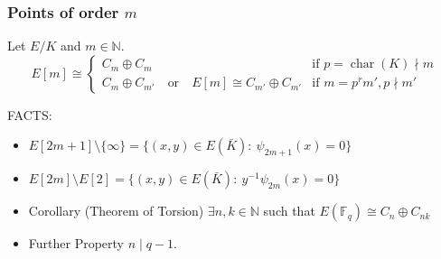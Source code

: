 \documentclass{beamer}%
\newcommand{\N}{\mathbb N}
\newcommand{\F}{\mathbb F}
\theoremstyle{definition}
\begin{document}
\begin{frame}\frametitle{Points of order $m$}
\pause

\begin{theorem}
Let $E/K$  and $m\in\N$. 
$$E[m]\cong \begin{cases}
             C_m\oplus C_m & \text{if }p=\operatorname{char}(K)\nmid m\\
             C_m\oplus C_{m'}\quad\text{or}\quad E[m] \cong C_{m'}\oplus C_{m'} &\text{if }m=p^rm', p\nmid m'
            \end{cases}
$$\end{theorem}\pause

\vspace*{-5mm}
\begin{beamerboxesrounded}[upper=block title example,lower=block body alerted,shadow=true]{FACTS:}
\begin{itemize}[<+-| alert@+>]
\item $E[2m+1]\setminus \{\infty\}= \{(x,y)\in E(\bar{K}):\  \psi_{2m+1}(x)=0\}$
\item $E[2m]\setminus E[2]= \{(x,y)\in E(\bar{K}):\  y^{-1}\psi_{2m}(x)=0\}$
\item \alert{Corollary (Theorem of Torsion)} $\exists n,k\in\mathbb N$ such that
$E(\F_q)\cong C_n\oplus C_{nk}$
\item \alert{Further Property} $n\mid q-1$.
\end{itemize}
\end{beamerboxesrounded}




\end{frame}
\end{document}
